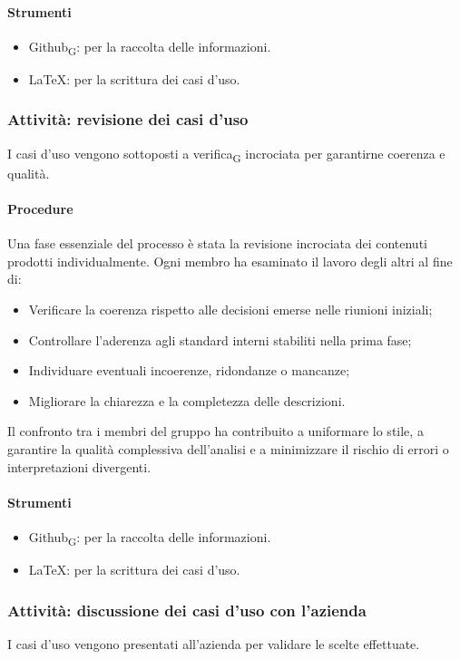 \documentclass[11pt,a4paper]{article}
\newcommand{\gls}[1]{#1\textsubscript{G}}
\begin{document}
\paragraph{Strumenti}
\begin{itemize}
\item \gls{Github}: per la raccolta delle informazioni.
\item LaTeX: per la scrittura dei casi d'uso.
\end{itemize}

\subsubsection{Attività: revisione dei casi d'uso}
I casi d’uso vengono sottoposti a \gls{verifica} incrociata per garantirne coerenza e qualità.

\paragraph{Procedure}
Una fase essenziale del processo è stata la revisione incrociata dei contenuti prodotti individualmente.
Ogni membro ha esaminato il lavoro degli altri al fine di:
\begin{itemize}
\item Verificare la coerenza rispetto alle decisioni emerse nelle riunioni iniziali;
\item Controllare l’aderenza agli standard interni stabiliti nella prima fase;
\item Individuare eventuali incoerenze, ridondanze o mancanze;
\item Migliorare la chiarezza e la completezza delle descrizioni.
\end{itemize}
Il confronto tra i membri del gruppo ha contribuito a uniformare lo stile, a garantire la qualità complessiva dell’analisi e a minimizzare il rischio di errori o interpretazioni divergenti.

\paragraph{Strumenti}
\begin{itemize}
\item \gls{Github}: per la raccolta delle informazioni.
\item LaTeX: per la scrittura dei casi d'uso.
\end{itemize}

\subsubsection{Attività: discussione dei casi d’uso con l’azienda}
I casi d’uso vengono presentati all’azienda per validare le scelte effettuate.
\end{document}
